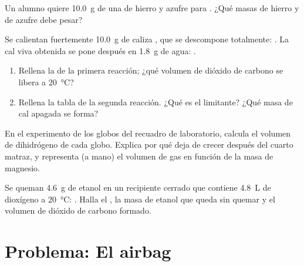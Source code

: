 \begin{exercise}[$\star\star\star$]\label{exo:g10:reaction-progress-table:12}
Un alumno quiere \qty{10.0}{g} de una  de hierro y
azufre para . ¿Qué masas de hierro y de azufre debe
pesar?
\end{exercise}

\begin{exercise}[$\star\star\star$]\label{exo:g10:reaction-progress-table:13}
Se calientan fuertemente \qty{10.0}{g} de caliza , que se
descompone totalmente: . La cal viva 
obtenida se pone después en \qty{1.8}{g} de agua:
.
\begin{enumerate}
  \item Rellena la  de la primera reacción; ¿qué volumen
        de dióxido de carbono se libera a \qty{20}{\celsius}?
  \item Rellena la tabla de la segunda reacción. ¿Qué  es el
        limitante? ¿Qué masa de cal apagada  se forma?
\end{enumerate}
\end{exercise}

\begin{exercise}[$\star\star\star$]\label{exo:g10:reaction-progress-table:14}
En el experimento de los globos del recuadro de laboratorio, calcula el
volumen de dihidrógeno de cada globo. Explica por qué deja de crecer
después del cuarto matraz, y representa (a mano) el volumen de gas en
función de la masa de magnesio.
\end{exercise}

\begin{exercise}[$\star\star\star$]\label{exo:g10:reaction-progress-table:15}
Se queman \qty{4.6}{g} de etanol  en un recipiente cerrado
que contiene \qty{4.8}{L} de dioxígeno a \qty{20}{\celsius}:
. Halla el , la masa
de etanol que queda sin quemar y el volumen de dióxido de carbono
formado.
\end{exercise}

\section{Problema: El airbag}

